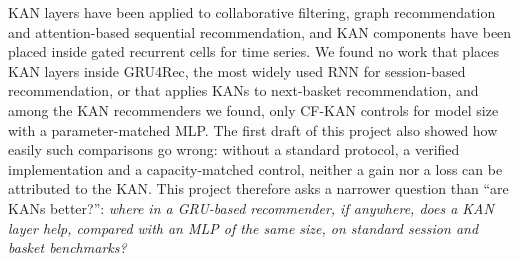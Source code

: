 KAN layers have been applied to collaborative filtering, graph recommendation and
attention-based sequential recommendation, and KAN components have been placed
inside gated recurrent cells for time series. We found no work that places KAN
layers inside GRU4Rec, the most widely used RNN for session-based recommendation,
or that applies KANs to next-basket recommendation, and among the KAN
recommenders we found, only CF-KAN controls for model size with a
parameter-matched MLP. The first draft of this
project also showed how easily such comparisons go wrong: without a standard
protocol, a verified implementation and a capacity-matched control, neither a
gain nor a loss can be attributed to the KAN. This project therefore asks a
narrower question than ``are KANs better?'': \emph{where in a GRU-based
recommender, if anywhere, does a KAN layer help, compared with an MLP of the same
size, on standard session and basket benchmarks?}
